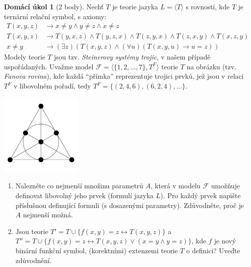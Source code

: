 \documentclass[a4paper]{article}
\theoremstyle{definition}
\newtheorem*{ukol}{Domácí úkol}
\begin{document}
\medskip\begin{ukol}[2 body]
    Nechť $T$ je teorie jazyka $L=\langle T \rangle$ s rovností, kde $T$ je ternární relační symbol, s axiomy:
    \begin{align*}
        T(x,y,z)&\to x\ne y \wedge y\ne z \wedge x\ne z \\
        T(x,y,z)&\to T(y,x,z)\wedge T(y,z,x)\wedge T(z,y,x)\wedge T(z,x,y)\wedge T(x,z,y)\\
        x\ne y &\to (\exists z)(T(x,y,z)\wedge(\forall u)(T(x,y,u)\to u=z))
    \end{align*}
    Modely teorie $T$ jsou tzv. \emph{Steinerovy systémy trojic}, v našem případě uspořádaných. Uvažme model $\mathcal{F}=\langle \{1,2,\dots,7\},T^F\rangle$ teorie $T$ na obrázku (tzv. \emph{Fanova rovina}), kde každá ``přímka'' reprezentuje trojici prvků, jež jsou v relaci $T^F$ v libovolném pořadí, tedy $T^F=\{(2,4,6),(6,2,4),\dots\}$.
    \begin{center}
        \includegraphics[height=4cm]{files/fano.png}  
    \end{center}
    \begin{enumerate}[label=(\alph*),noitemsep,topsep=6pt]
        
        \item Nalezněte co nejmenší množinu parametrů $A$, která v modelu $\mathcal{F}$ umožňuje definovat libovolný jeho prvek (formulí jazyka $L$). Pro každý prvek napište příslušnou definující formuli (s dosazenými parametry). Zdůvodněte, proč je $A$ nejmenší možná.
        \item Jsou teorie $T'=T \cup \{f(x,y)=z \leftrightarrow T(x,y,z)\}$ a $T''=T\cup \{f(x,y)=z \leftrightarrow T(x,y,z) \vee (x=y \wedge y=z)\}$, kde $f$ je nový binární funkční symbol, (korektními) extenzemi teorie $T$ o definici? Uveďte zdůvodnění.
    \end{enumerate} 
\end{ukol}
\end{document}
